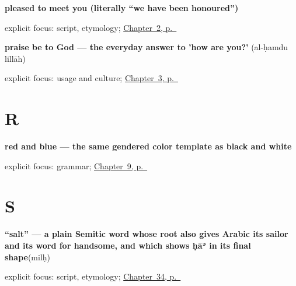 \noindent\begin{minipage}[t]{\linewidth}
\raggedright
\textbf{pleased to meet you (literally \textquotedblleft{}we have been honoured\textquotedblright{})}\enspace\emph{}\par
\footnotesize explicit focus: script, etymology; \hyperref[ch:introductions]{Chapter~2, p.~\pageref*{ch:introductions}}
\end{minipage}\par\smallskip

\noindent\begin{minipage}[t]{\linewidth}
\raggedright
\textbf{praise be to God — the everyday answer to 'how are you?'}\enspace\emph{ }\enspace(al-ḥamdu lillāh)\par
\footnotesize explicit focus: usage and culture; \hyperref[ch:ar-how-are-you]{Chapter~3, p.~\pageref*{ch:ar-how-are-you}}
\end{minipage}\par\smallskip

\section*{R}

\noindent\begin{minipage}[t]{\linewidth}
\raggedright
\textbf{red and blue — the same gendered color template as black and white}\enspace\emph{ }\par
\footnotesize explicit focus: grammar; \hyperref[ch:ar-core-colours]{Chapter~9, p.~\pageref*{ch:ar-core-colours}}
\end{minipage}\par\smallskip

\section*{S}

\noindent\begin{minipage}[t]{\linewidth}
\raggedright
\textbf{\textquotedblleft{}salt\textquotedblright{} — a plain Semitic word whose root also gives Arabic its sailor and its word for handsome, and which shows ḥāʾ in its final shape}\enspace\emph{}\enspace(milḥ)\par
\footnotesize explicit focus: script, etymology; \hyperref[ch:ar-asking-for-food]{Chapter~34, p.~\pageref*{ch:ar-asking-for-food}}
\end{minipage}\par\smallskip

